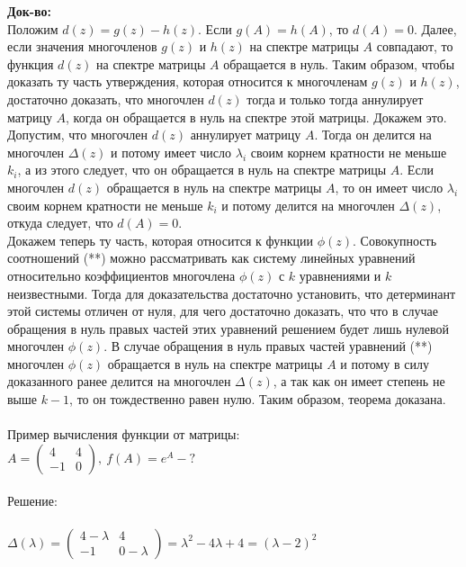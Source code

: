 \documentclass[14pt]{extarticle}
\begin{document}
\textbf{Док-во:} \\
Положим $d(z) = g(z) - h(z)$. Если $g(A) = h(A)$,
то $d(A) = 0$. Далее, если значения многочленов $g(z)$ и $h(z)$ на спектре 
матрицы $A$ совпадают, то функция $d(z)$ на спектре матрицы $A$ обращается в нуль.
Таким образом, чтобы доказать ту часть утверждения, которая относится к 
многочленам $g(z)$ и $h(z)$, достаточно доказать, что многочлен $d(z)$ тогда 
и только тогда аннулирует матрицу $A$, когда он обращается в нуль на 
спектре этой матрицы. Докажем это. \\
Допустим, что многочлен $d(z)$ аннулирует матрицу $A$. Тогда он делится на 
многочлен $\Delta(z)$ и потому имеет число $\lambda_i$ своим корнем кратности 
не меньше $k_i$, а из этого следует, что он обращается в нуль на спектре 
матрицы $A$. Если многочлен $d(z)$ обращается в нуль на спектре матрицы $A$, 
то он имеет число $\lambda_i$ своим корнем кратности не меньше $k_i$ и потому
делится на многочлен $\Delta(z)$, откуда следует, что $d(A) = 0$. \\
Докажем теперь ту часть, которая относится к функции $\phi(z)$. Совокупность 
соотношений (**) можно рассматривать как систему линейных уравнений относительно
коэффициентов многочлена $\phi(z)$ с $k$ уравнениями и $k$ неизвестными. Тогда
для доказательства достаточно установить, что детерминант этой системы отличен
от нуля, для чего достаточно доказать, что что в случае обращения в нуль 
правых частей этих уравнений решением будет лишь нулевой многочлен $\phi(z)$.
В случае обращения в нуль правых частей уравнений (**) многочлен $\phi(z)$
обращается в нуль на спектре матрицы $A$ и потому в силу доказанного ранее 
делится на многочлен $\Delta(z)$, а так как он имеет степень не выше $k-1$, 
то он тождественно равен нулю. Таким образом, теорема доказана.\\
\\
Пример вычисления функции от матрицы:\\
$A = \begin{pmatrix}
    4 & 4\\ 
    -1 & 0
  \end{pmatrix}, \ f(A) = e^A - ?$\\\\
Решение:\\\\
$\Delta(\lambda) =\begin{pmatrix}
    4 - \lambda & 4\\ 
    -1 & 0 - \lambda
  \end{pmatrix} = \lambda^2 - 4\lambda + 4 = (\lambda-2)^2$\\\\
\end{document}
